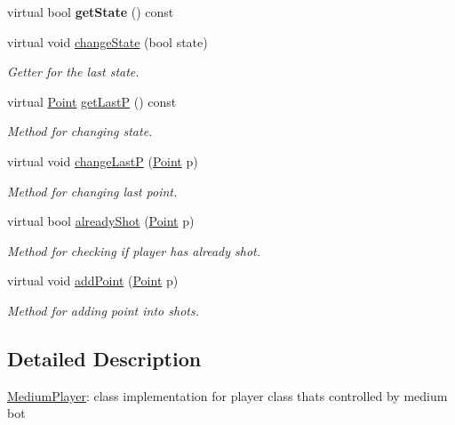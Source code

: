 \begin{DoxyCompactItemize}
\mbox{\label{class_medium_player_a90a8cd5feeaa759043af77afe266907c}} 
virtual bool {\bfseries get\+State} () const
\item 
\mbox{\label{class_medium_player_ae0f69d678d6567e09baed0350468be61}} 
virtual void \mbox{\hyperlink{class_medium_player_ae0f69d678d6567e09baed0350468be61}{change\+State}} (bool state)
\begin{DoxyCompactList}\small\item\em Getter for the last state. \end{DoxyCompactList}\item 
\mbox{\label{class_medium_player_abd585986250a5b713d6a554ea70e3ba6}} 
virtual \mbox{\hyperlink{class_point}{Point}} \mbox{\hyperlink{class_medium_player_abd585986250a5b713d6a554ea70e3ba6}{get\+LastP}} () const
\begin{DoxyCompactList}\small\item\em Method for changing state. \end{DoxyCompactList}\item 
virtual void \mbox{\hyperlink{class_medium_player_afc952f7dac91d979743154c021d8dee8}{change\+LastP}} (\mbox{\hyperlink{class_point}{Point}} p)
\begin{DoxyCompactList}\small\item\em Method for changing last point. \end{DoxyCompactList}\item 
virtual bool \mbox{\hyperlink{class_medium_player_a0c237af510ff84898759ed2e9a9271ce}{already\+Shot}} (\mbox{\hyperlink{class_point}{Point}} p)
\begin{DoxyCompactList}\small\item\em Method for checking if player has already shot. \end{DoxyCompactList}\item 
virtual void \mbox{\hyperlink{class_medium_player_a4cd5cbf0327e002112c80a52b279358f}{add\+Point}} (\mbox{\hyperlink{class_point}{Point}} p)
\begin{DoxyCompactList}\small\item\em Method for adding point into shots. \end{DoxyCompactList}\end{DoxyCompactItemize}


\subsection{Detailed Description}
\mbox{\hyperlink{class_medium_player}{Medium\+Player}}\+: class implementation for player class that\textquotesingle{}s controlled by medium bot 

